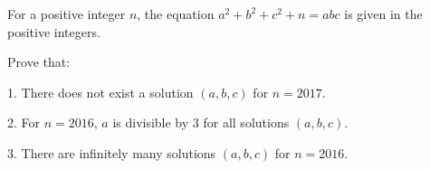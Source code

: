 For a positive integer $n$,  the equation $a^2 + b^2 + c^2 + n = abc$ is given in the positive integers.

Prove that:

1. There does not exist a solution $(a, b, c)$ for $n = 2017$.

2. For $n = 2016$,  $a$ is divisible by $3$ for all solutions $(a, b, c)$.

3. There are infinitely many solutions $(a, b, c)$ for $n = 2016$.